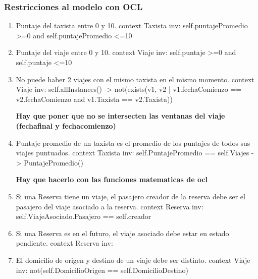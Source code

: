 \subsubsection{Restricciones al modelo con OCL}
\begin{enumerate}
	\item \begin{ocl}{Puntaje del taxista entre 0 y 10.}
		  context Taxista
		  inv: self.puntajePromedio >=0 and
		       self.puntajePromedio <=10
		\end{ocl}
	
	\item \begin{ocl}{Puntaje del viaje entre 0 y 10.}
		  context Viaje
		  inv: self.puntaje >=0 and
		       self.puntaje <=10
		\end{ocl}

	\item \begin{ocl}{No puede haber 2 viajes con el mismo taxista en el mismo momento.}
		  context Viaje
		  inv: self.allInstances() -> not(exists(v1, v2 | v1.fechaComienzo == v2.fechaComienzo 
		                                            and v1.Taxista == v2.Taxista))
		\end{ocl}
		\textbf{Hay que poner que no se intersecten las ventanas del viaje (fechafinal y fechacomienzo)}

	\item \begin{ocl}{Puntaje promedio de un taxista es el promedio de los puntajes de todos sus viajes puntuados.}
		  context Taxista
		  inv: self.PuntajePromedio == self.Viajes -> PuntajePromedio()
		\end{ocl}
		\textbf{Hay que hacerlo con las funciones matematicas de ocl}

	\item \begin{ocl}{Si una Reserva tiene un viaje, el pasajero creador de la reserva debe ser el pasajero del viaje asociado a la reserva.}
		  context Reserva
		  inv: self.ViajeAsociado.Pasajero == self.creador
		\end{ocl}

	\item \begin{ocl}{Si una Reserva es en el futuro, el viaje asociado debe estar en estado pendiente.}
		  context Reserva
		  inv: 
		\end{ocl}

	\item \begin{ocl}{El domicilio de origen y destino de un viaje debe ser distinto.}
		  context Viaje
		  inv: not(self.DomicilioOrigen == self.DomicilioDestino)
		\end{ocl}


\end{enumerate}
